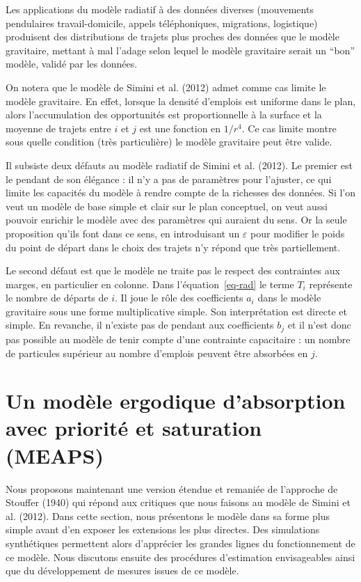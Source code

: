 \documentclass[
  10pt,
  a4paper,
  numbers=noendperiod,
  DIV=12]{scrartcl}
\begin{document}
Les applications du modèle radiatif à des données diverses (mouvements
pendulaires travail-domicile, appels téléphoniques, migrations,
logistique) produisent des distributions de trajets plus proches des
données que le modèle gravitaire, mettant à mal l'adage selon lequel le
modèle gravitaire serait un ``bon'' modèle, validé par les données.

On notera que le modèle de Simini et al. (2012) admet comme cas limite
le modèle gravitaire. En effet, lorsque la densité d'emplois est
uniforme dans le plan, alors l'accumulation des opportunités est
proportionnelle à la surface et la moyenne de trajets entre \(i\) et
\(j\) est une fonction en \(1/r^4\). Ce cas limite montre sous quelle
condition (très particulière) le modèle gravitaire peut être valide.

Il subsiste deux défauts au modèle radiatif de Simini et al. (2012). Le
premier est le pendant de son élégance : il n'y a pas de paramètres pour
l'ajuster, ce qui limite les capacités du modèle à rendre compte de la
richesses des données. Si l'on veut un modèle de base simple et clair
sur le plan conceptuel, on veut aussi pouvoir enrichir le modèle avec
des paramètres qui auraient du sens. Or la seule proposition qu'ils font
dans ce sens, en introduisant un \(\varepsilon\) pour modifier le poids
du point de départ dans le choix des trajets n'y répond que très
partiellement.

Le second défaut est que le modèle ne traite pas le respect des
contraintes aux marges, en particulier en colonne. Dans
l'équation~\ref{eq-rad} le terme \(T_i\) représente le nombre de départs
de \(i\). Il joue le rôle des coefficients \(a_i\) dans le modèle
gravitaire sous une forme multiplicative simple. Son interprétation est
directe et simple. En revanche, il n'existe pas de pendant aux
coefficients \(b_j\) et il n'est donc pas possible au modèle de tenir
compte d'une contrainte capacitaire : un nombre de particules supérieur
au nombre d'emplois peuvent être absorbées en \(j\).

\hypertarget{sec-meaps}{%
\section{Un modèle ergodique d'absorption avec priorité et saturation
(MEAPS)}\label{sec-meaps}}

Nous proposons maintenant une version étendue et remaniée de l'approche
de Stouffer (1940) qui répond aux critiques que nous faisons au modèle
de Simini et al. (2012). Dans cette section, nous présentons le modèle
dans sa forme plus simple avant d'en exposer les extensions les plus
directes. Des simulations synthétiques permettent alors d'apprécier les
grandes lignes du fonctionnement de ce modèle. Nous discutons ensuite
des procédures d'estimation envisageables ainsi que du développement de
mesures issues de ce modèle.
\end{document}
